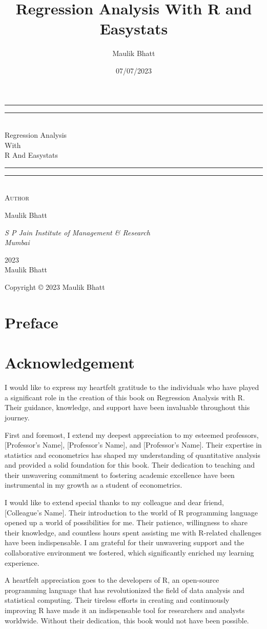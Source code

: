 \documentclass[
  letterpaper,
  paper =a4,
  twoside,
  openright,
  headsepline,
  footsepline,
  listof = totocnumbered,
  chapterprefix = true,
  firstiscover]{scrbook}
\title{Regression Analysis With R and Easystats}
\author{Maulik Bhatt}
\date{07/07/2023}
\renewcommand{\maketitle}{
\begin{titlepage}
		\pagecolor{myblue}
		\color{white}
	\centering
	\vspace*{\baselineskip}
	\rule{\textwidth}{1.6pt}\vspace*{-\baselineskip}\vspace*{2pt}
	\rule{\textwidth}{0.4pt}\\[\baselineskip]
	{\LARGE Regression Analysis\\ With \\[0.3\baselineskip] R And Easystats}\\[0.2\baselineskip]
	\rule{\textwidth}{0.4pt}\vspace*{-\baselineskip}\vspace{3.2pt}
	\rule{\textwidth}{1.6pt}\\[\baselineskip]
	\scshape
	\vspace*{8\baselineskip}
	Author \\[\baselineskip]
	{\Large Maulik Bhatt \par}
	{\itshape S P Jain Institute of Management \& Research \\ Mumbai\par}
	\vfill
	{\scshape 2023} \\
	{\large Maulik Bhatt}\par%

\end{titlepage}
\nopagecolor%
\newpage
	
	\thispagestyle{empty}
	
	\begin{center}
		
		Copyright © 2023 Maulik Bhatt
		
	\end{center}
	\newpage
}
\renewcommand*\contentsname{Table of contents}
\newcommand\contentsname{Table of contents}
\begin{document}
\frontmatter
\maketitle
\renewcommand*\contentsname{Contents}
{
\hypersetup{linkcolor=}
\setcounter{tocdepth}{2}
\tableofcontents
}
\listoffigures
\listoftables
{}
\mainmatter
{}

\hypertarget{preface}{%
\chapter*{Preface}\label{preface}}



\hypertarget{acknowledgement}{%
\chapter*{Acknowledgement}\label{acknowledgement}}


I would like to express my heartfelt gratitude to the individuals who
have played a significant role in the creation of this book on
Regression Analysis with R. Their guidance, knowledge, and support have
been invaluable throughout this journey.

First and foremost, I extend my deepest appreciation to my esteemed
professors, {[}Professor's Name{]}, {[}Professor's Name{]}, and
{[}Professor's Name{]}. Their expertise in statistics and econometrics
has shaped my understanding of quantitative analysis and provided a
solid foundation for this book. Their dedication to teaching and their
unwavering commitment to fostering academic excellence have been
instrumental in my growth as a student of econometrics.

I would like to extend special thanks to my colleague and dear friend,
{[}Colleague's Name{]}. Their introduction to the world of R programming
language opened up a world of possibilities for me. Their patience,
willingness to share their knowledge, and countless hours spent
assisting me with R-related challenges have been indispensable. I am
grateful for their unwavering support and the collaborative environment
we fostered, which significantly enriched my learning experience.

A heartfelt appreciation goes to the developers of R, an open-source
programming language that has revolutionized the field of data analysis
and statistical computing. Their tireless efforts in creating and
continuously improving R have made it an indispensable tool for
researchers and analysts worldwide. Without their dedication, this book
would not have been possible.
\end{document}
